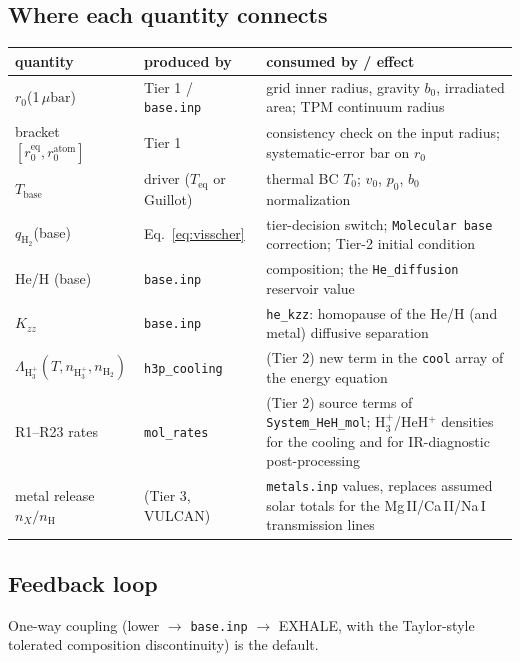 \documentclass[english,a4paper]{my_memo}
\newcommand{\ubar}{\mu\mathrm{bar}}
\newcommand{\qHH}{q_{\mathrm{H_2}}}
\begin{document}
\subsection{Where each quantity connects}
\begin{center}\small
\begin{tabular}{@{}p{3.6cm}p{2.9cm}p{9.2cm}@{}}
\toprule
quantity & produced by & consumed by / effect \\
\midrule
$r_0$(1\,$\ubar$) & Tier 1 / \texttt{base.inp} & grid inner radius, gravity $b_0$,
  irradiated area; TPM continuum radius \\
bracket $[r_0^\mathrm{eq}, r_0^\mathrm{atom}]$ & Tier 1 & consistency check on the input
  radius; systematic-error bar on $r_0$ \\
$T_\mathrm{base}$ & driver ($T_\mathrm{eq}$ or Guillot) & thermal BC $T_0$; $v_0$, $p_0$,
  $b_0$ normalization \\
$\qHH$(base) & Eq.~\eqref{eq:visscher} & tier-decision switch; \texttt{Molecular base}
  correction; Tier-2 initial condition \\
He/H (base) & \texttt{base.inp} & composition; the \texttt{He\_diffusion} reservoir value \\
$K_{zz}$ & \texttt{base.inp} & \texttt{he\_kzz}: homopause of the He/H (and metal)
  diffusive separation \\
$\Lambda_{\mathrm{H_3^+}}(T,n_{\mathrm{H_3^+}},n_\mathrm{H_2})$ & \texttt{h3p\_cooling} &
  (Tier 2) new term in the \texttt{cool} array of the energy equation \\
R1--R23 rates & \texttt{mol\_rates} & (Tier 2) source terms of
  \texttt{System\_HeH\_mol}; H$_3^+$/HeH$^+$ densities for the cooling and for
  IR-diagnostic post-processing \\
metal release $n_X/n_\mathrm{H}$ & (Tier 3, VULCAN) & \texttt{metals.inp} values,
  replaces assumed solar totals for the Mg\,II/Ca\,II/Na\,I transmission lines \\
\bottomrule
\end{tabular}
\end{center}

\subsection{Feedback loop}\label{sub:feedback}
One-way coupling (lower $\to$ \texttt{base.inp} $\to$ EXHALE, with the Taylor-style
tolerated composition discontinuity) is the default.
\end{document}
